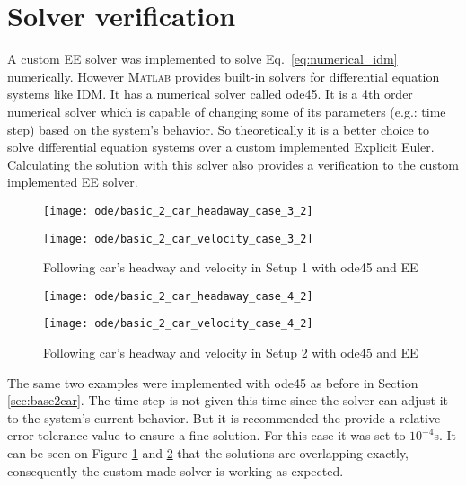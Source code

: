 	\section{Solver verification}
		A custom EE solver was implemented to solve Eq.~\eqref{eq:numerical_idm} numerically. However \textsc{Matlab} provides built-in solvers for differential equation systems like IDM. It has a numerical solver called ode45. It is a 4th order numerical solver which is capable of changing some of its parameters (e.g.: time step) based on the system's behavior. So theoretically it is a better choice to solve differential equation systems over a custom implemented Explicit Euler. Calculating the solution with this solver also provides a verification to the custom implemented EE solver. 
		\begin{figure}
			\centering
			\begin{minipage}{.5\textwidth}
				\centering
				\texttt{[image: ode/basic\_2\_car\_headaway\_case\_3\_2]}
			\end{minipage}\hfill
			\begin{minipage}{.5\textwidth}
				\centering
				\texttt{[image: ode/basic\_2\_car\_velocity\_case\_3\_2]}
			\end{minipage}
			\caption{Following car's headway and velocity in Setup 1 with ode45 and EE}
			\label{fig:basic2car_case_1_ode}
		\end{figure}
		\begin{figure}
			\centering
			\begin{minipage}{.5\textwidth}
				\centering
				\texttt{[image: ode/basic\_2\_car\_headaway\_case\_4\_2]}
			\end{minipage}\hfill
			\begin{minipage}{.5\textwidth}
				\centering
				\texttt{[image: ode/basic\_2\_car\_velocity\_case\_4\_2]}
			\end{minipage}
			\caption{Following car's headway and velocity in Setup 2 with ode45 and EE}
			\label{fig:basic2car_case_2_ode}
		\end{figure}

		The same two examples were implemented with ode45 as before in Section \ref{sec:base2car}. The time step is not given this time since the solver can adjust it to the system's current behavior. But it is recommended the provide a relative error tolerance value to ensure a fine solution. For this case it was set to $10^{-4}$s.
		It can be seen on Figure \ref{fig:basic2car_case_1_ode} and \ref{fig:basic2car_case_2_ode} that the solutions are overlapping exactly, consequently the custom made solver is working as expected.
